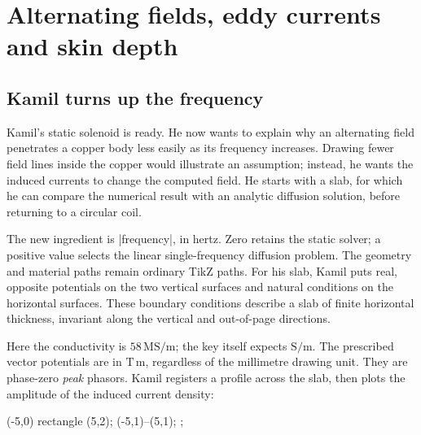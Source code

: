 \section{Alternating fields, eddy currents and skin depth}
\label{sec:harmonic}

\subsection{Kamil turns up the frequency}
Kamil's static solenoid is ready. He now wants to explain why an alternating
field penetrates a copper body less easily as its frequency increases.
Drawing fewer field lines inside the copper would illustrate an assumption;
instead, he wants the induced currents to change the computed field.
He starts with a slab, for which he can compare the numerical result with an
analytic diffusion solution, before returning to a circular coil.

The new ingredient is |frequency|, in hertz. Zero retains the static solver;
a positive value selects the linear single-frequency diffusion problem.
The geometry and material paths remain ordinary TikZ paths. For his slab,
Kamil puts real, opposite potentials on the two vertical surfaces and natural
conditions on the horizontal surfaces. These boundary conditions describe a slab of finite horizontal thickness,
invariant along the vertical and out-of-page directions.
\begin{codeexample}
\end{codeexample}
Here the conductivity is $58\,\mathrm{MS/m}$; the key itself expects
$\mathrm{S/m}$. The prescribed vector potentials are in $\mathrm{T\,m}$,
regardless of the millimetre drawing unit. They are phase-zero \emph{peak}
phasors. Kamil registers a profile across the slab, then plots the amplitude
of the induced current density:
\begin{codeexample}
\filldraw[fill=orange!20,
  femm/region={material=slab copper}] (-5,0) rectangle (5,2);
\path[femm/profile={name=skin,samples=101}] (-5,1)--(5,1);
;
\femmplot[profile=skin,component=Jeddy,abscissa=x,
  representation=amplitude]
\end{codeexample}

